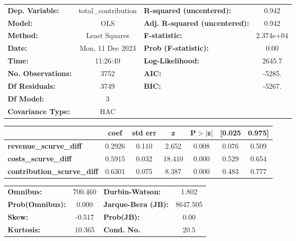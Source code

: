 \begin{center}
\begin{tabular}{lclc}
\toprule
\textbf{Dep. Variable:}             & total\_contribution & \textbf{  R-squared (uncentered):}      &     0.942   \\
\textbf{Model:}                     &         OLS         & \textbf{  Adj. R-squared (uncentered):} &     0.942   \\
\textbf{Method:}                    &    Least Squares    & \textbf{  F-statistic:       }          & 2.374e+04   \\
\textbf{Date:}                      &   Mon, 11 Dec 2023  & \textbf{  Prob (F-statistic):}          &     0.00    \\
\textbf{Time:}                      &       11:26:49      & \textbf{  Log-Likelihood:    }          &    2645.7   \\
\textbf{No. Observations:}          &          3752       & \textbf{  AIC:               }          &    -5285.   \\
\textbf{Df Residuals:}              &          3749       & \textbf{  BIC:               }          &    -5267.   \\
\textbf{Df Model:}                  &             3       & \textbf{                     }          &             \\
\textbf{Covariance Type:}           &         HAC         & \textbf{                     }          &             \\
\bottomrule
\end{tabular}
\begin{tabular}{lcccccc}
                                    & \textbf{coef} & \textbf{std err} & \textbf{z} & \textbf{P$> |$z$|$} & \textbf{[0.025} & \textbf{0.975]}  \\
\midrule
\textbf{revenue\_scurve\_diff}      &       0.2926  &        0.110     &     2.652  &         0.008        &        0.076    &        0.509     \\
\textbf{costs\_scurve\_diff}        &       0.5915  &        0.032     &    18.410  &         0.000        &        0.529    &        0.654     \\
\textbf{contribution\_scurve\_diff} &       0.6301  &        0.075     &     8.387  &         0.000        &        0.483    &        0.777     \\
\bottomrule
\end{tabular}
\begin{tabular}{lclc}
\textbf{Omnibus:}       & 700.460 & \textbf{  Durbin-Watson:     } &    1.802  \\
\textbf{Prob(Omnibus):} &   0.000 & \textbf{  Jarque-Bera (JB):  } & 8647.505  \\
\textbf{Skew:}          &  -0.517 & \textbf{  Prob(JB):          } &     0.00  \\
\textbf{Kurtosis:}      &  10.365 & \textbf{  Cond. No.          } &     20.5  \\
\bottomrule
\end{tabular}
\end{center}